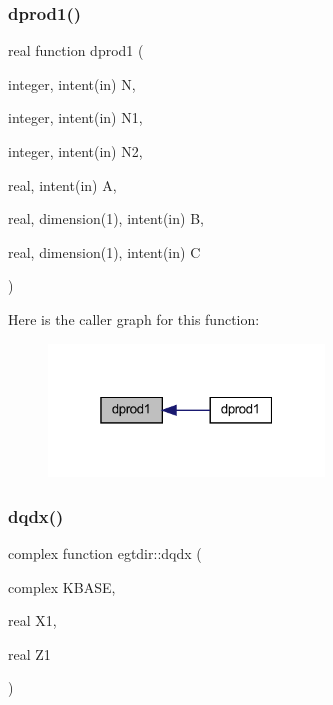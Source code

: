 \subsubsection{\texorpdfstring{dprod1()}{dprod1()}}
{\footnotesize\ttfamily real function dprod1 (\begin{DoxyParamCaption}\item[{integer, intent(in)}]{N,  }\item[{integer, intent(in)}]{N1,  }\item[{integer, intent(in)}]{N2,  }\item[{real, intent(in)}]{A,  }\item[{real, dimension(1), intent(in)}]{B,  }\item[{real, dimension(1), intent(in)}]{C }\end{DoxyParamCaption})}

Here is the caller graph for this function\+:\nopagebreak
\begin{figure}[H]
\begin{center}
\leavevmode
\includegraphics[width=208pt]{Leroi_8f90_a728fa0fc652b63cee1eb0d408bbac553_icgraph}
\end{center}
\end{figure}
\mbox{\label{Leroi_8f90_a0dd58336077baa8c233cc4d08cc10939}} 
\subsubsection{\texorpdfstring{dqdx()}{dqdx()}}
{\footnotesize\ttfamily complex function egtdir\+::dqdx (\begin{DoxyParamCaption}\item[{complex}]{K\+B\+A\+SE,  }\item[{real}]{X1,  }\item[{real}]{Z1 }\end{DoxyParamCaption})}

